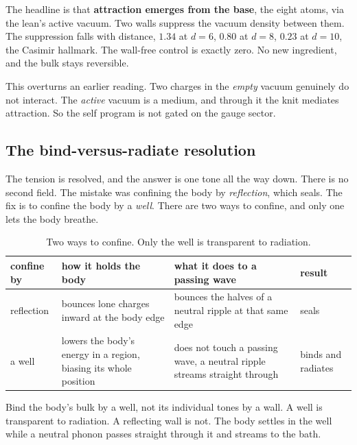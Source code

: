 The headline is that \textbf{attraction emerges from the base}, the eight atoms, via the lean's active vacuum. Two
walls suppress the vacuum density between them. The suppression falls with distance, $1.34$ at $d = 6$, $0.80$ at
$d = 8$, $0.23$ at $d = 10$, the Casimir hallmark. The wall-free control is exactly zero. No new ingredient, and
the bulk stays reversible.

This overturns an earlier reading. Two charges in the \emph{empty} vacuum genuinely do not interact. The
\emph{active} vacuum is a medium, and through it the knit mediates attraction. So the self program is not gated on
the gauge sector.

\subsection{The bind-versus-radiate resolution}

The tension is resolved, and the answer is one tone all the way down. There is no second field. The mistake was
confining the body by \emph{reflection}, which seals. The fix is to confine the body by a \emph{well}. There are
two ways to confine, and only one lets the body breathe.

\begin{table}[ht]
\centering
\begin{tabular}{@{}lp{}p{}l@{}}
\toprule
confine by & how it holds the body & what it does to a passing wave & result \\
\midrule
reflection & bounces lone charges inward at the body edge & bounces the halves of a neutral ripple at that same
edge & seals \\
a well & lowers the body's energy in a region, biasing its whole position & does not touch a passing wave, a
neutral ripple streams straight through & binds and radiates \\
\bottomrule
\end{tabular}
\caption{Two ways to confine. Only the well is transparent to radiation.}
\label{tab:well-vs-wall}
\end{table}

\begin{principle}
Bind the body's bulk by a well, not its individual tones by a wall. A well is transparent to radiation. A
reflecting wall is not. The body settles in the well while a neutral phonon passes straight through it and streams
to the bath.
\end{principle}

